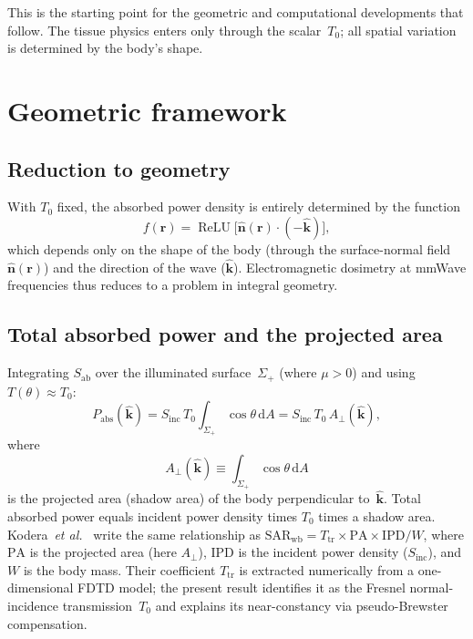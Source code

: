\documentclass[11pt,a4paper]{article}
\theoremstyle{definition}      %
\newcommand{\khat}{\hat{\bm{k}}}
\newcommand{\nhat}{\hat{\bm{n}}}
\newcommand{\rr}{\mathbf{r}}
\newcommand{\Sinc}{S_{\mathrm{inc}}}
\newcommand{\Sab}{S_{\mathrm{ab}}}
\newcommand{\Aperp}{A_{\perp}}
\newcommand{\SARwb}{\mathrm{SAR}_{\mathrm{wb}}}
\DeclareMathOperator{\ReLU}{ReLU}
\newcommand{\diff}{\mathrm{d}}        %
\begin{document}
This is the starting point for the geometric and computational
developments that follow.  The tissue physics enters only through the
scalar~$T_0$; all spatial variation is determined by the body's shape.


\section{Geometric framework}\label{sec:geometry}

\subsection{Reduction to geometry}\label{sec:geom-reduction}

With $T_0$ fixed, the absorbed power density is entirely determined by
the function
\begin{equation}\label{eq:f-geom}
  f(\rr) = \ReLU\!\bigl[\nhat(\rr)\cdot(-\khat)\bigr],
\end{equation}
which depends only on the shape of the body (through the
surface-normal field~$\nhat(\rr)$) and the direction of the
wave ($\khat$).  Electromagnetic dosimetry at mmWave frequencies thus
reduces to a problem in integral geometry.

\subsection{Total absorbed power and the projected area}
\label{sec:total-power}

Integrating $\Sab$ over the illuminated surface~$\Sigma_+$ (where
$\mu>0$) and using $T(\theta)\approx T_0$:
\begin{equation}\label{eq:Pabs-Aperp}
  P_{\mathrm{abs}}(\khat)
  = \Sinc\,T_0 \int_{\Sigma_+}\!\!\cos\theta\,\diff A
  = \Sinc\,T_0\,\Aperp(\khat),
\end{equation}
where
\begin{equation}\label{eq:Aperp-def}
  \Aperp(\khat) \equiv \int_{\Sigma_+}\cos\theta\,\diff A
\end{equation}
is the projected area (shadow area) of the body perpendicular
to~$\khat$.  Total absorbed power equals incident power density times
$T_0$ times a shadow area.  Kodera~\textit{et al.}~\cite{Kodera2024}
write the same relationship as
$\SARwb = T_{\mathrm{tr}}\times\mathrm{PA}\times\mathrm{IPD}/W$,
where $\mathrm{PA}$ is the projected area (here $\Aperp$),
$\mathrm{IPD}$ is the incident power density ($\Sinc$), and $W$ is the
body mass.  Their coefficient $T_{\mathrm{tr}}$ is extracted numerically
from a one-dimensional FDTD model; the present result identifies it as the
Fresnel normal-incidence transmission~$T_0$ and explains its near-constancy
via pseudo-Brewster compensation.
\end{document}
